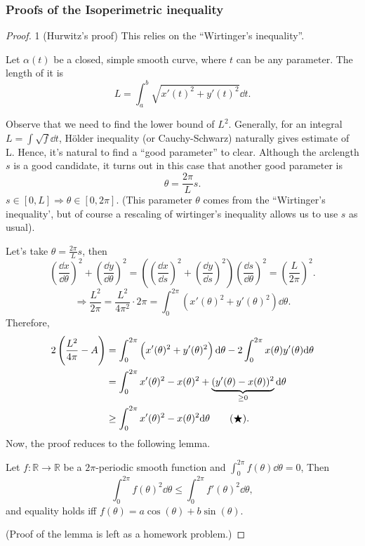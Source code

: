 \subsubsection*{Proofs of the Isoperimetric inequality}
\begin{proof}1 (Hurwitz's proof) This relies on the ``Wirtinger's inequality''.

    Let $\alpha(t)$ be a closed, simple smooth curve, where $t$ can be any parameter. The length of it is
    \[L=\int_a^b\sqrt{x'(t)^2+y'(t)^2}\dd t.\]

    Observe that we need to find the lower bound of $L^2$.
    Generally, for an integral $L=\int \sqrt{f}\dd t$, H\"older
    inequality (or Cauchy-Schwarz) naturally gives estimate of
    L. Hence, it's natural to find a ``good parameter'' to
    clear. Although the arclength $s$ is a good candidate, it
    turns out in this case that another good parameter is
    \[\theta=\frac{2\pi}{L}s.\]
    $s\in [0,L]\Rightarrow \theta \in [0,2\pi]$.
    (This parameter $\theta$ comes from the ``Wirtinger's inequality', but of course a rescaling of wirtinger's inequality allows us to use $s$ as usual).

    Let's take $\theta=\frac{2\pi}{L}s$, then
    \[\left(\frac{\dd x}{\dd \theta}\right)^2+\left(\frac{\dd y}{\dd \theta}\right)^2=\left(\left(\frac{\dd x}{\dd s}\right)^2+\left(\frac{\dd y}{\dd s}\right)^2\right)\left(\frac{\dd s}{\dd \theta}\right)^2=\left(\frac{L}{2\pi}\right)^2.\]
    \[\Rightarrow \frac{L^2}{2\pi}=\frac{L^2}{4\pi^2}\cdot 2\pi=\int_0^{2\pi}\left(x'(\theta)^2+y'(\theta)^2\right)\dd \theta.\]
    Therefore,
    \begin{align}
        2\left(\frac{L^2}{4\pi}-A\right) & =\int_0^{2\pi}\left(x'(\theta)^2+y'(\theta)^2\right)\dd \theta-2\int_0^{2\pi}x(\theta)y'(\theta)\dd \theta \notag \\
                                         & =\int_0^{2\pi}x'(\theta)^2-x(\theta)^2+\underbrace{(y'(\theta)-x(\theta))^2}_{\ge 0}\dd \theta \notag             \\
                                         & \ge \int_0^{2\pi}x'(\theta)^2-x(\theta)^2 \dd \theta \tag{$\bigstar$}
        .\end{align}
    Now, the proof reduces to the following lemma.

    \begin{lemma}
        Let $f\colon\mathbb{R}\to \mathbb{R}$ be a $2\pi$-periodic smooth
        function and $\int_0^{2\pi}f(\theta)\dd \theta=0$, Then
        \[\int_0^{2\pi}f(\theta)^2\dd \theta\le \int_0^{2\pi}f'(\theta)^2\dd \theta,\]
        and equality holds iff $f(\theta)=a\cos(\theta)+b\sin(\theta)$.
    \end{lemma}
    (Proof of the lemma is left as a homework problem.)


\end{proof}
